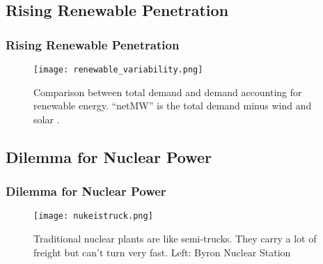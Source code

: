 \subsection{Rising Renewable Penetration}
\begin{frame}
  \frametitle{Rising Renewable Penetration}
  \begin{figure}
    \texttt{[image: renewable\_variability.png]}
    \caption{Comparison between total demand and demand accounting for renewable energy. ``netMW'' is the total demand minus wind and solar \cite{alsoenergy_university_2019, uiuc_illini_2019}. }
    \label{fig:variability}
  \end{figure}
\end{frame}

\subsection{Dilemma for Nuclear Power}
\begin{frame}
  \frametitle{Dilemma for Nuclear Power}
  \begin{figure}
    \texttt{[image: nukeistruck.png]}
    \caption{Traditional nuclear plants are like semi-trucks. They carry a lot of freight but can't turn very fast. Left: Byron Nuclear Station}
    \label{fig:semitruck}
  \end{figure}
\end{frame}
